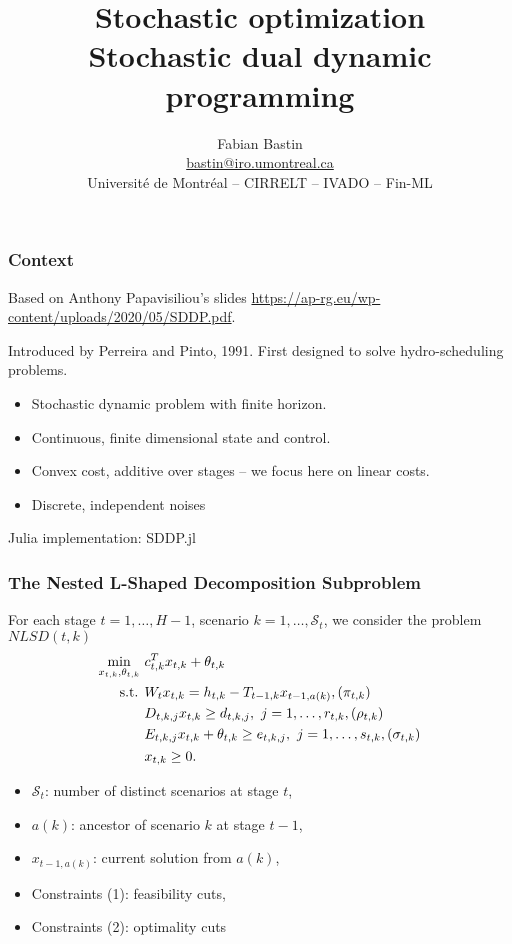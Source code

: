 \documentclass{beamer}
\title[SA vs SAA]{Stochastic optimization\\Stochastic dual dynamic programming}
\author[Fabian Bastin]{Fabian Bastin \\ \url{bastin@iro.umontreal.ca} \\ Université de Montréal -- CIRRELT -- IVADO -- Fin-ML}
\date{}
\def\KK{\mathcal{K}}
\def\KK{\mathcal{S}}
\begin{document}
\frame{\titlepage}

\begin{frame}
\frametitle{Context}

Based on Anthony Papavisiliou's slides \url{https://ap-rg.eu/wp-content/uploads/2020/05/SDDP.pdf}.

\mbox{}

Introduced by Perreira and Pinto, 1991.
First designed to solve hydro-scheduling problems.

\mbox{}

\begin{itemize}
\item
Stochastic dynamic problem with finite horizon.
\item
Continuous, finite dimensional state and control.
\item
Convex cost, additive over stages -- we focus here on linear costs.
\item
Discrete, independent noises
\end{itemize}

\mbox{}

Julia implementation: SDDP.jl

\end{frame}

\begin{frame}
\frametitle{The Nested L-Shaped Decomposition Subproblem}

For each stage $t = 1,\ldots, H-1$, scenario $k = 1,\ldots,\KK_t$, we consider the problem $NLSD(t,k)$
\begin{align}
\min_{x_{t,k}, \theta_{t,k}}\ & c_{t,k}^T x_{t,k} + \theta_{t,k} \notag \\
\mbox{s.t. } &
W_t x_{t,k} = h_{t,k} - T_{t-1,k} x_{t-1,a(k)}, (\pi_{t,k})  \notag \\
& D_{t,k,j}x_{t,k} \geq d_{t,k,j},\ j = 1,\ldots,r_{t,k}, (\rho_{t,k}) \\
& E_{t,k,j}x_{t,k} + \theta_{t,k} \geq e_{t,k,j},\ j = 1,\ldots, s_{t,k}, (\sigma_{t,k}) \\
&
\begin{aligned}
 x_{t,k} \geq 0.  \notag
\end{aligned}
\end{align}
\begin{itemize}
\item
$\KK_t$: number of distinct scenarios at stage $t$,
\item
$a(k)$: ancestor of scenario $k$ at stage $t - 1$,
\item
$x_{t-1,a(k)}$: current solution from $a(k)$,
\item
Constraints (1): feasibility cuts,
\item
Constraints (2): optimality cuts
\end{itemize}

\end{frame}
\end{document}
